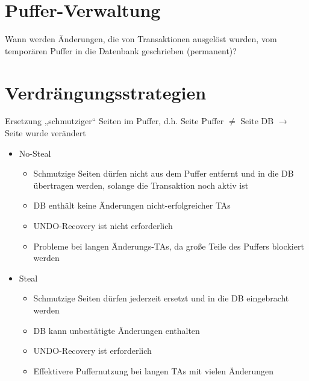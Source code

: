 \documentclass{lehramt-informatik}
\begin{document}
%

\section{Puffer-Verwaltung}

\cite[Seite 25]{db:fs:5}
\cite[Seite 305]{kemper}

Wann werden Änderungen, die von Transaktionen ausgelöst wurden, vom
temporären Puffer in die Datenbank geschrieben (permanent)?

%

\section{Verdrängungsstrategien}

Ersetzung „schmutziger“ Seiten im Puffer, d.h. Seite Puffer $\neq$ Seite
DB $\rightarrow$ Seite wurde verändert

\begin{itemize}

\item No-Steal

\begin{itemize}
\item Schmutzige Seiten dürfen nicht aus dem Puffer entfernt und in die
DB übertragen werden, solange die Transaktion noch aktiv ist

\item DB enthält keine Änderungen nicht-erfolgreicher TAs

\item UNDO-Recovery ist nicht erforderlich

\item Probleme bei langen Änderungs-TAs, da große Teile des Puffers
blockiert werden
\end{itemize}

\item Steal

\begin{itemize}
\item Schmutzige Seiten dürfen jederzeit ersetzt und in die DB
eingebracht werden

\item DB kann unbestätigte Änderungen enthalten

\item UNDO-Recovery ist erforderlich

\item Effektivere Puffernutzung bei langen TAs mit vielen Änderungen
\end{itemize}
\end{itemize}
\end{document}
